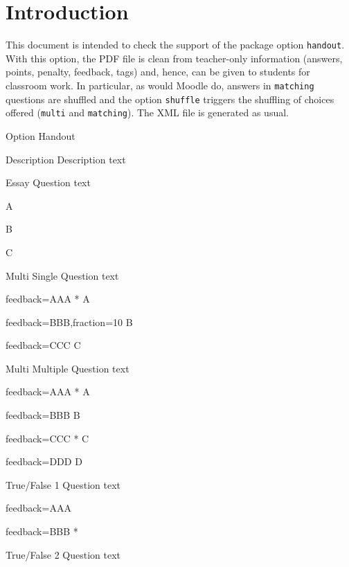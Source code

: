 \documentclass{article}
\begin{document}
\section*{Introduction}

This document is intended to check the support of the package option 
\texttt{handout}. With this option, the PDF file is clean from teacher-only 
information (answers, points, penalty, feedback, tags) and, hence, can be given 
to students for classroom work. In particular, as would Moodle do, 
answers in \texttt{matching} questions are shuffled and the option 
\texttt{shuffle} triggers the shuffling of choices offered (\texttt{multi} and 
\texttt{matching}). The XML file is generated as usual.

\begin{quiz}[points=1.0,tags={tag},feedback={General feedback},shuffle]{ Option 
Handout}

\begin{description}{Description}
Description text
\end{description}

\begin{essay}{Essay}
Question text
\item A
\item B
\item C
\end{essay}

\begin{multi}[shuffle=false]{Multi Single}
Question text
\item[feedback={AAA}]* A
\item[feedback={BBB},fraction=10] B
\item[feedback={CCC}] C
\end{multi}

\begin{multi}[multiple]{Multi Multiple}
Question text
\item[feedback={AAA}]* A
\item[feedback={BBB}] B
\item[feedback={CCC}]* C
\item[feedback={DDD}] D
\end{multi}

\begin{truefalse}{True/False 1}
Question text
\item[feedback={AAA}]
\item[feedback={BBB}]*
\end{truefalse}

\begin{truefalse}{True/False 2}
Question text
\item*
\end{truefalse}


\end{quiz}
\end{document}
